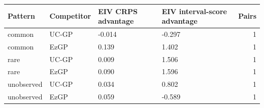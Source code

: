 
\begin{tabular}{llllr}
\toprule
Pattern & Competitor & EIV CRPS advantage & EIV interval-score advantage & Pairs\\
\midrule
common & UC-GP & -0.014 & -0.297 & 1\\
common & EzGP & 0.139 & 1.402 & 1\\
rare & UC-GP & 0.009 & 1.506 & 1\\
rare & EzGP & 0.090 & 1.596 & 1\\
unobserved & UC-GP & 0.034 & 0.802 & 1\\
\addlinespace
unobserved & EzGP & 0.059 & -0.589 & 1\\
\bottomrule
\end{tabular}
